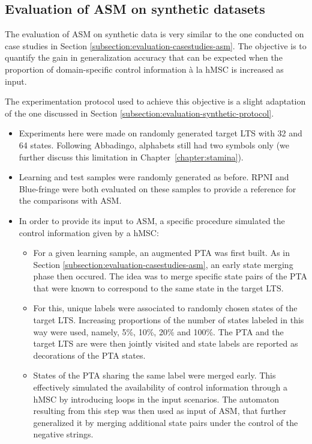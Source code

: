 \subsection{Evaluation of ASM on synthetic datasets\label{subsection:evaluation-synthetic-asm}}

The evaluation of ASM on synthetic data is very similar to the one conducted on case studies in Section \ref{subsection:evaluation-casestudies-asm}. The objective is to quantify the gain in generalization accuracy that can be expected when the proportion of domain-specific control information \`a la hMSC is increased as input. 

The experimentation protocol used to achieve this objective is a slight adaptation of the one discussed in Section \ref{subsection:evaluation-synthetic-protocol}.
\begin{itemize}
\item Experiments here were made on randomly generated target LTS with 32 and 64 states. Following Abbadingo, alphabets still had two symbols only (we further discuss this limitation in Chapter~\ref{chapter:stamina}).
\item Learning and test samples were randomly generated as before. RPNI and Blue-fringe were both evaluated on these samples to provide a reference for the comparisons with ASM.  
\item In order to provide its input to ASM, a specific procedure simulated the control information given by a hMSC:
\begin{itemize}
\item For a given learning sample, an augmented PTA was first built. As in Section \ref{subsection:evaluation-casestudies-asm}, an early state merging phase then occured. The idea was to merge specific state pairs of the PTA that were known to correspond to the same state in the target LTS.
\item For this, unique labels were associated to randomly chosen states of the target LTS. Increasing proportions of the number of states labeled in this way were used, namely, 5\%, 10\%, 20\% and 100\%. The PTA and the target LTS are were then jointly visited and state labels are reported as decorations of the PTA states. 
\item States of the PTA sharing the same label were merged early. This effectively simulated the availability of control information through a hMSC by introducing loops in the input scenarios. The automaton resulting from this step was then used as input of ASM, that further generalized it by merging additional state pairs under the control of the negative strings.
\end{itemize}
\end{itemize}
 
